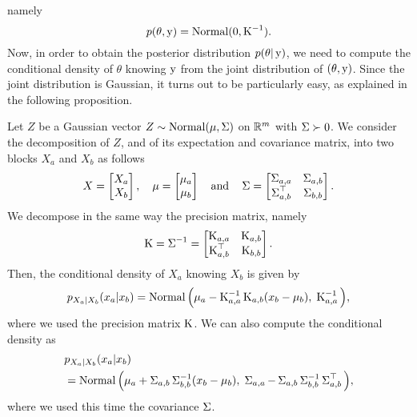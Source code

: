 namely 
\begin{equation*}
	p(\theta, \operatorname{{\boldsymbol y}}) = \operatorname{Normal}(0, \operatorname{{\boldsymbol K}}^{-1}).
\end{equation*}
Now, in order to obtain the posterior distribution $p(\theta | \operatorname{{\boldsymbol y}})$, we need to compute the conditional density of $\theta$ 
knowing $\operatorname{{\boldsymbol y}}$ from the joint distribution of $(\theta, \operatorname{{\boldsymbol y}})$.
Since the joint distribution is Gaussian, it turns out to be particularly easy, as explained in the following proposition.
\begin{proposition}
	\label{prop:cond-gaussian-vector}
	Let $Z$ be a Gaussian vector $Z \sim \operatorname{Normal}(\mu, \operatorname{\boldsymbol \Sigma})$ on $\mathbb R^m$ with $\operatorname{\boldsymbol \Sigma} \succ 0$. 
	We consider the decomposition of $Z$, and of its expectation and covariance matrix, into two blocks $X_a$ and $X_b$ as follows
	\begin{equation*}
		X = 
		\begin{bmatrix}
			X_a \\
			X_b
		\end{bmatrix},
		\quad
		\mu =
		\begin{bmatrix}
			\mu_a \\
			\mu_b	
		\end{bmatrix}
		\quad \text{and} \quad
		\operatorname{\boldsymbol \Sigma} = 
		\begin{bmatrix}
			\operatorname{\boldsymbol \Sigma}_{a, a} & \operatorname{\boldsymbol \Sigma}_{a, b} \\
			\operatorname{\boldsymbol \Sigma}_{a, b}^\top & \operatorname{\boldsymbol \Sigma}_{b, b}
		\end{bmatrix}.
	\end{equation*}
	We decompose in the same way the precision matrix, namely
	\begin{equation}
		\operatorname{{\boldsymbol K}} = \operatorname{\boldsymbol \Sigma}^{-1} =
		\begin{bmatrix}
			\operatorname{{\boldsymbol K}}_{a, a} & \operatorname{{\boldsymbol K}}_{a, b} \\
			\operatorname{{\boldsymbol K}}_{a, b}^\top & \operatorname{{\boldsymbol K}}_{b, b}
		\end{bmatrix}.		
	\end{equation}
	Then, the conditional density of $X_a$ knowing $X_b$ is given by
	\begin{equation*}
		p_{X_a | X_b}(x_a | x_b) = 
		\operatorname{Normal} \Big( \mu_a - \operatorname{{\boldsymbol K}}_{a, a}^{-1} \operatorname{{\boldsymbol K}}_{a, b} (x_b - \mu_b), 
		\; \operatorname{{\boldsymbol K}}_{a, a}^{-1} \Big),
	\end{equation*}
	where we used the precision matrix $\operatorname{{\boldsymbol K}}$. 
	We can also compute the conditional density as
	\begin{align*}
		&p_{X_a | X_b}(x_a | x_b) \\
		&= \operatorname{Normal} \Big( \mu_a + \operatorname{\boldsymbol \Sigma}_{a, b} \operatorname{\boldsymbol \Sigma}_{b, b}^{-1} (x_b - \mu_b), 
		\; \operatorname{\boldsymbol \Sigma}_{a, a} - \operatorname{\boldsymbol \Sigma}_{a, b} \operatorname{\boldsymbol \Sigma}_{b, b}^{-1} \operatorname{\boldsymbol \Sigma}_{a, b}^\top \Big),	
	\end{align*}
	where we used this time the covariance $\operatorname{\boldsymbol \Sigma}$.
\end{proposition}
